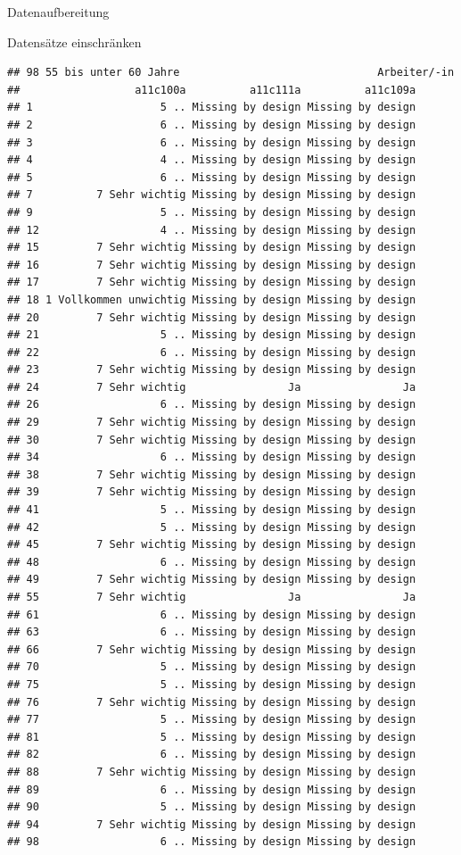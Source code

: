\documentclass[ignorenonframetext,]{beamer}
\begin{document}
\begin{frame}[fragile]{Datenaufbereitung}
\begin{block}{Datensätze einschränken}
\begin{verbatim}
## 98 55 bis unter 60 Jahre                               Arbeiter/-in
##                  a11c100a          a11c111a          a11c109a
## 1                    5 .. Missing by design Missing by design
## 2                    6 .. Missing by design Missing by design
## 3                    6 .. Missing by design Missing by design
## 4                    4 .. Missing by design Missing by design
## 5                    6 .. Missing by design Missing by design
## 7          7 Sehr wichtig Missing by design Missing by design
## 9                    5 .. Missing by design Missing by design
## 12                   4 .. Missing by design Missing by design
## 15         7 Sehr wichtig Missing by design Missing by design
## 16         7 Sehr wichtig Missing by design Missing by design
## 17         7 Sehr wichtig Missing by design Missing by design
## 18 1 Vollkommen unwichtig Missing by design Missing by design
## 20         7 Sehr wichtig Missing by design Missing by design
## 21                   5 .. Missing by design Missing by design
## 22                   6 .. Missing by design Missing by design
## 23         7 Sehr wichtig Missing by design Missing by design
## 24         7 Sehr wichtig                Ja                Ja
## 26                   6 .. Missing by design Missing by design
## 29         7 Sehr wichtig Missing by design Missing by design
## 30         7 Sehr wichtig Missing by design Missing by design
## 34                   6 .. Missing by design Missing by design
## 38         7 Sehr wichtig Missing by design Missing by design
## 39         7 Sehr wichtig Missing by design Missing by design
## 41                   5 .. Missing by design Missing by design
## 42                   5 .. Missing by design Missing by design
## 45         7 Sehr wichtig Missing by design Missing by design
## 48                   6 .. Missing by design Missing by design
## 49         7 Sehr wichtig Missing by design Missing by design
## 55         7 Sehr wichtig                Ja                Ja
## 61                   6 .. Missing by design Missing by design
## 63                   6 .. Missing by design Missing by design
## 66         7 Sehr wichtig Missing by design Missing by design
## 70                   5 .. Missing by design Missing by design
## 75                   5 .. Missing by design Missing by design
## 76         7 Sehr wichtig Missing by design Missing by design
## 77                   5 .. Missing by design Missing by design
## 81                   5 .. Missing by design Missing by design
## 82                   6 .. Missing by design Missing by design
## 88         7 Sehr wichtig Missing by design Missing by design
## 89                   6 .. Missing by design Missing by design
## 90                   5 .. Missing by design Missing by design
## 94         7 Sehr wichtig Missing by design Missing by design
## 98                   6 .. Missing by design Missing by design
\end{verbatim}


\end{block}
\end{frame}
\end{document}
